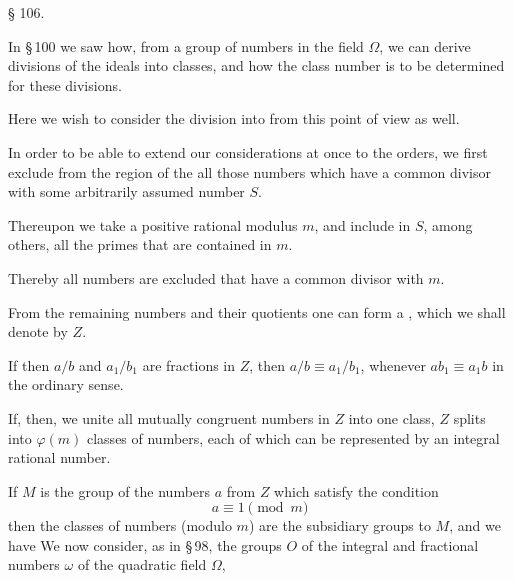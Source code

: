 \begin{center}
§ 106. 
\end{center}

In \S\,100 we saw how, from a group of numbers in the field
$\Omega$, we can derive divisions of the ideals into classes, and
how the class number is to be determined for these divisions.

Here we wish to consider the division into  from
this point of view as well.

In order to be able to extend our considerations at once to
 the orders, we first exclude from the region of the  all those numbers which have a common divisor with
some arbitrarily assumed number $S$.

Thereupon we take a positive rational modulus $m$, and
include in $S$, among others, all the primes that are contained
 in $m$.

Thereby all numbers are excluded that have a common
 divisor with $m$.

From the remaining numbers and their quotients one can
form a , which we shall denote
by $Z$.


If then $a/b$ and $a_1/b_1$ are fractions in $Z$, then $a/b \equiv a_1/b_1$,
whenever $ab_1 \equiv a_1 b$ in the ordinary sense.

If, then, we unite all mutually congruent numbers
in $Z$ into one class, $Z$ splits into $\varphi(m)$ classes of numbers, each
of which can be represented by an integral rational number.

If $M$ is the group of the numbers $a$ from $Z$ which satisfy the condition
\[
a \equiv 1 \pmod m
\]
then the classes of numbers (modulo $m$) are the subsidiary groups
to $M$, and we have
We now consider, as in \S\,98, the groups $O$ of the integral
and fractional numbers $\omega$ of the quadratic field $\Omega$, 
